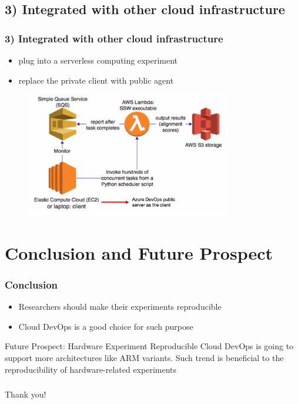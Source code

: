 \documentclass[notheorems]{beamer}
\begin{document}
\subsection{3) Integrated with other cloud infrastructure}
\begin{frame}
\frametitle{3) Integrated with other cloud infrastructure}
\begin{itemize}
\item plug into a serverless computing experiment
\item replace the private client with public agent
\end{itemize}
\begin{figure}
\includegraphics[width=0.8\textwidth]{pic/serverless_show.png}
\end{figure}
\end{frame}
\section{Conclusion and Future Prospect}
\begin{frame}
\frametitle{Conclusion}
\begin{itemize}
\item Researchers should make their experiments reproducible
\item Cloud DevOps is a good choice for such purpose
\end{itemize}
\begin{block}{Future Prospect: Hardware Experiment Reproducible}
Cloud DevOps is going to support more architectures like ARM variants.
Such trend is beneficial to the reproducibility of hardware-related experiments
\end{block}
\end{frame}

\begin{frame}
\frametitle{}
\begin{block}{}
\centering
{\Huge Thank you!}
\end{block}
\end{frame}
\end{document}
